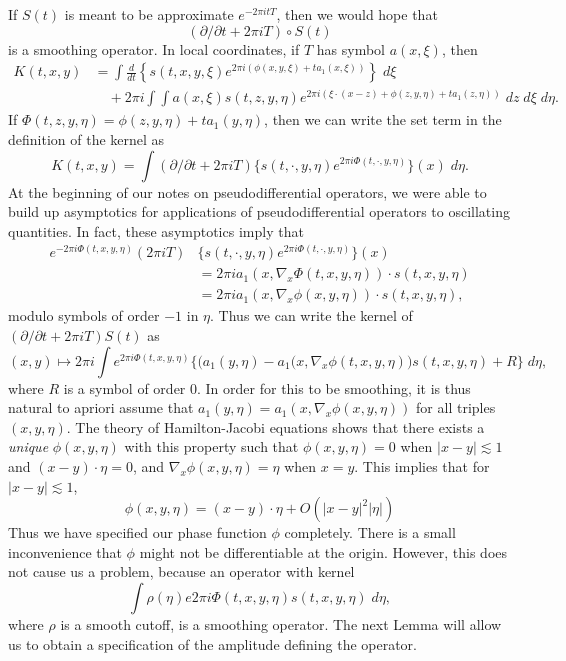 If $S(t)$ is meant to be approximate $e^{-2 \pi i t T}$, then we would hope that
%
\[ (\partial / \partial t + 2 \pi i T) \circ S(t) \]
%
is a smoothing operator. In local coordinates, if $T$ has symbol $a(x,\xi)$, then
%
\begin{align*}
    K(t,x,y) &= \int \frac{d}{dt} \left\{ s(t,x,y,\xi) e^{2 \pi i (\phi(x,y,\xi) + t a_1(x,\xi))} \right\}\; d\xi\\
    &\quad + 2 \pi i \int \int a(x,\xi) s(t,z,y,\eta) e^{2 \pi i ( \xi \cdot (x - z) + \phi(z,y,\eta) + t a_1(z,\eta))}\; dz\; d\xi\; d\eta.
\end{align*}
%
If $\Phi(t,z,y,\eta) = \phi(z,y,\eta) + t a_1(y,\eta)$, then we can write the set term in the definition of the kernel as
%
\[ K(t,x,y) = \int (\partial / \partial t + 2 \pi i T) \{ s(t,\cdot,y,\eta) e^{2 \pi i \Phi(t,\cdot, y, \eta)} \}(x)\; d\eta. \]
%
At the beginning of our notes on pseudodifferential operators, we were able to build up asymptotics for applications of pseudodifferential operators to oscillating quantities. In fact, these asymptotics imply that
%
\begin{align*}
    e^{-2 \pi i \Phi(t,x,y,\eta)} (2 \pi i T) & \{ s(t,\cdot,y,\eta) e^{2 \pi i \Phi(t,\cdot, y, \eta)} \}(x)\\
    &= 2 \pi i a_1(x, \nabla_x \Phi(t,x,y,\eta)) \cdot s(t,x,y,\eta)\\
    &= 2 \pi i a_1(x, \nabla_x \phi(x,y,\eta)) \cdot s(t,x,y,\eta),
\end{align*}
%
modulo symbols of order $-1$ in $\eta$. Thus we can write the kernel of $(\partial / \partial t + 2 \pi i T) S(t)$ as
%
\[ (x,y) \mapsto 2 \pi i \int e^{2 \pi i \Phi(t,x,y,\eta)} \Bigg\{ \Big( a_1(y,\eta) - a_1(x, \nabla_x \phi(t,x,y,\eta) \Big) s(t,x,y,\eta) + R \Bigg\} \; d\eta, \]
%
where $R$ is a symbol of order $0$. In order for this to be smoothing, it is thus natural to apriori assume that $a_1(y,\eta) = a_1(x,\nabla_x \phi(x,y,\eta))$ for all triples $(x,y,\eta)$. The theory of Hamilton-Jacobi equations shows that there exists a \emph{unique} $\phi(x,y,\eta)$ with this property such that $\phi(x,y,\eta) = 0$ when $|x - y| \lesssim 1$ and $(x - y) \cdot \eta = 0$, and $\nabla_x \phi(x,y,\eta) = \eta$ when $x = y$. This implies that for $|x - y| \lesssim 1$,
%
\[ \phi(x,y,\eta) = (x - y) \cdot \eta + O( |x - y|^2 |\eta| ) \]
%
Thus we have specified our phase function $\phi$ completely. There is a small inconvenience that $\phi$ might not be differentiable at the origin. However, this does not cause us a problem, because an operator with kernel
%
\[ \int \rho(\eta) e{2 \pi i \Phi(t,x,y,\eta)} s(t,x,y,\eta)\; d\eta, \]
%
where $\rho$ is a smooth cutoff, is a smoothing operator. The next Lemma will allow us to obtain a specification of the amplitude defining the operator.

